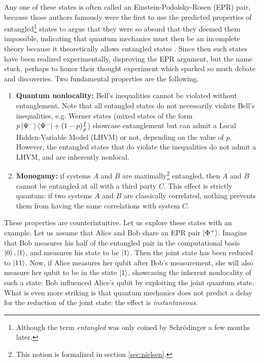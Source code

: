 Any one of these states is often called an Einstein-Podolsky-Rosen (EPR) pair, because those authors famously were the first to use the predicted properties of entangled\footnote{Although the term \textit{entangled} was only coined by Schrödinger a few months later.} states to argue that they were so absurd that they deemed them impossible, indicating that quantum mechanics must then be an incomplete theory because it theoretically allows entangled states \cite{einstein_can_1935}. Since then such states have been realized experimentally, disproving the EPR argument, but the name stuck, perhaps to honor their thought experiment which sparked so much debate and discoveries. Two fundamental properties are the following.

\begin{enumerate} %
    \item \textbf{Quantum nonlocality:} Bell's inequalities cannot be violated without entanglement. Note that all entangled states do not necessarily violate Bell's inequalities, e.g. Werner states (mixed states of the form $p\ket{\Psi^-}\bra{\Psi^-} + (1-p)\frac{I}{p}$) showcase entanglement but can admit a Local Hidden-Variable Model (LHVM) or not, depending on the value of $p$. However, the entangled states that do violate the inequalities do not admit a LHVM, and are inherently nonlocal.
    \item \textbf{Monogamy:} if systems $A$ and $B$ are maximally\footnote{This notion is formalized in section \ref{sec:nielsen}.} entangled, then $A$ and $B$ cannot be entangled at all with a third party $C$. This effect is strictly quantum: if two systems $A$ and $B$ are classically correlated, nothing prevents them from having the same correlations with system $C$.
\end{enumerate}

These properties are counterintuitive. Let us explore these states with an example. Let us assume that Alice and Bob share an EPR pair $\ket{\Phi^+}$. Imagine that Bob measures his half of the entangled pair in the computational basis $\ket{0}, \ket{1}$, and measures his state to be $\ket{1}$. Then the joint state has been reduced to $\ket{11}$. Now, if Alice measures her qubit after Bob's measurement, she will also measure her qubit to be in the state $\ket{1}$, showcasing the inherent nonlocality of such a state: Bob influenced Alice's qubit by exploiting the joint quantum state. What is even more striking is that quantum mechanics does not predict a delay for the reduction of the joint state: the effect is \textit{instantaneous}.

